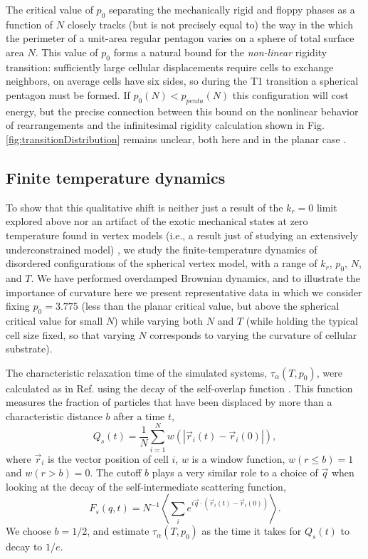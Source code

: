 \documentclass[aps,pre,reprint,superscriptaddress,nofootinbib]{revtex4-2}
\begin{document}
The critical value of $p_0$ separating the mechanically rigid and floppy phases as a function of $N$ closely tracks (but is not precisely equal to) the way in the which the perimeter of a unit-area regular pentagon varies on a sphere of total surface area $N$. This value of $p_0$ forms a natural bound for the \emph{non-linear} rigidity transition: sufficiently large cellular displacements require cells to exchange neighbors, on average cells have six sides, so during the T1 transition a spherical pentagon must be formed. If $p_0(N) < p_{penta}(N)$ this configuration will cost energy, but the precise connection between this bound on the nonlinear behavior of rearrangements and the infinitesimal rigidity calculation shown in Fig. \ref{fig:transitionDistribution} remains unclear, both here and in the planar case \cite{moshe2018geometric}.

\subsection{Finite temperature dynamics}
To show that this qualitative shift is neither just a result of the $k_r=0$ limit explored above nor an artifact of the exotic mechanical states at zero temperature found in vertex models (i.e., a result just of studying an extensively underconstrained model) \cite{noll2017active, sussman2018no,merkel2019minimal,moshe2018geometric}, we study the finite-temperature dynamics of disordered configurations of the spherical vertex model, with a range of $k_r$, $p_0$, $N$, and $T$. We have performed overdamped Brownian dynamics, and to illustrate the importance of curvature here we present representative data in which we consider fixing $p_0 = 3.775$ (less than the planar critical value, but above the spherical critical value for small $N$) while varying both $N$ and $T$ (while holding the typical cell size fixed, so that varying $N$ corresponds to varying the curvature of cellular substrate). 

The characteristic relaxation time of the simulated systems, $\tau_\alpha(T,p_0)$,  were calculated as in Ref. \cite{Sussman2018epl} using the decay of the self-overlap function \cite{keys2007measurement}. This function measures the fraction of particles that have been displaced by more than a characteristic distance $b$ after a time $t$,
\begin{equation}
Q_s(t) = \frac{1}{N}\sum_{i=1}^N w \left( |\vec{r}_i(t) - \vec{r}_i(0) | \right),
\end{equation}
where $\vec{r}_i$ is the vector position of cell $i$, $w$ is a window function, $w(r \leq b) = 1$ and $w(r>b) = 0$. The cutoff $b$ plays a very similar role to a choice of  $\vec{q}$ when looking at the decay of the self-intermediate scattering function,
\begin{equation}
F_s(q,t)=N^{-1} \left\langle \sum_i e^{ i \vec{q}\cdot \left(\vec{r}_i(t) - \vec{r}_i(0)\right) } \right\rangle.
\end{equation}
We choose $b = 1/2$, and estimate $\tau_\alpha(T,p_0)$ as the time it takes for $Q_s(t)$ to decay to $1/e$.
\end{document}
